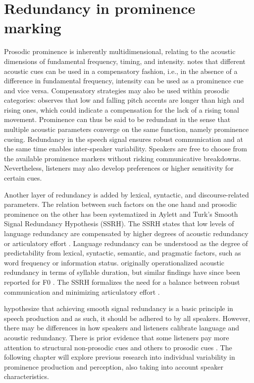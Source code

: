 \section{Redundancy in prominence marking} \label{section: redundancy}

Prosodic prominence is inherently multidimensional, relating to the acoustic dimensions of fundamental frequency, timing, and intensity. \citet{liebermanAcousticCorrelatesWord1960} notes that different acoustic cues can be used in a compensatory fashion, i.e., in the absence of a difference in fundamental frequency, intensity can be used as a prominence cue and vice versa. Compensatory strategies may also be used within prosodic categories: \citet{baumannImportanceTonalCues2014} observes that low and falling pitch accents are longer than high and rising ones, which could indicate a compensation for the lack of a rising tonal movement. Prominence can thus be said to be redundant in the sense that multiple acoustic parameters converge on the same function, namely prominence cueing. Redundancy in the speech signal ensures robust communication \citep{winterSpokenLanguageAchieves2014} and at the same time enables inter-speaker variability. Speakers are free to choose from the available prominence markers without risking communicative breakdowns. Nevertheless, listeners may also develop preferences or higher sensitivity for certain cues.

Another layer of redundancy is added by lexical, syntactic, and discourse-rela\-ted parameters. The relation between such factors on the one hand and prosodic prominence on the other has been systematized in Aylett and Turk's \citeyearpar{aylettSmoothSignalRedundancy2004} Smooth Signal Redundancy Hypothesis (SSRH). The SSRH states that low levels of language redundancy are compensated by higher degrees of acoustic redundancy or articulatory effort \citep[53]{aylettSmoothSignalRedundancy2004}. Language redundancy can be understood as the degree of predictability from lexical, syntactic, semantic, and pragmatic factors, such as word frequency or information status. \citet{aylettSmoothSignalRedundancy2004} originally operationalized acoustic redundancy in terms of syllable duration, but similar findings have since been reported for F0 \citep{turnbullRolePredictabilityIntonational2017}. The SSRH formalizes the need for a balance between robust communication and minimizing articulatory effort \citep[see also][]{lindblomExplainingPhoneticVariation1990}.

\citet{aylettSmoothSignalRedundancy2004} hypothesize that achieving smooth signal redundancy is a basic principle in speech production and as such, it should be adhered to by all speakers. However, there may be differences in how speakers and listeners calibrate language and acoustic redundancy. There is prior evidence that some listeners pay more attention to structural non-prosodic cues and others to prosodic cues \citep{baumannWhatMakesWord2018}. The following chapter will explore previous research into individual variability in prominence production and perception, also taking into account speaker characteristics.
